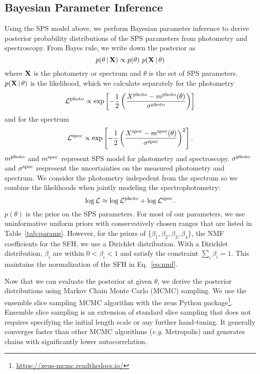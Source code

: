 \subsection{Bayesian Parameter Inference} \label{sec:infer} 
Using the SPS model above, we perform Bayesian parameter inference to derive
posterior probability distributions of the SPS parameters from photometry and
spectroscopy. 
From Bayes rule, we write down the posterior as
\begin{equation} \label{eq:bayes}
    p(\theta\given {\bf X}) \propto p(\theta)~p({\bf X} \given \theta)
\end{equation}
where ${\bf X}$ is the photometry or spectrum and $\theta$ is the set of SPS
parameters. 
$p({\bf X} \,|\, \theta)$ is the likelihood, which we calculate separately for
the photometry
\begin{equation}
    \mathcal{L}^{\rm photo} \propto \exp\left[-\frac{1}{2} \left(\frac{X^{\rm photo} -
    m^{\rm photo}(\theta)}{\sigma^{\rm photo}}\right)\right]
\end{equation}
and for the spectrum
\begin{equation}
    \mathcal{L}^{\rm spec} \propto \exp\left[-\frac{1}{2} \left(\frac{X^{\rm spec} -
    m^{\rm spec}(\theta)}{\sigma^{\rm spec}} \right)^2\right].
\end{equation}
$m^{\rm photo}$ and $m^{\rm spec}$ represent SPS model for photometry and
spectroscopy. 
$\sigma^{\rm photo}$ and $\sigma^{\rm spec}$ respresent the uncertainties on
the measured photometry and spectrum. 
We consider the photometry indepedent from the spectrum so we combine the
likelihoods when jointly modeling the spectrophotometry: 
\begin{equation}
    \log \mathcal{L} \approx \log \mathcal{L}^{\rm photo} + \log
    \mathcal{L}^{\rm spec}.
\end{equation}
$p(\theta)$ is the prior on the SPS parameters. 
For most of our parameters, we use uninformative uniform priors with
conservatively chosen ranges that are listed in Table~\ref{tab:params}. 
However, for the priors of $\{\beta_1, \beta_2, \beta_3, \beta_4 \}$, the NMF coefficients
for the SFH, we use a Dirichlet distribution.  
With a Dirichlet distribution, $\beta_i$ are within $0 < \beta_i < 1$ and
satisfy the constraint $\sum_i \beta_i = 1$. 
This maintains the normalization of the SFH in Eq.~\ref{eq:nmf}. 

Now that we can evaluate the posterior at given $\theta$, we derive the
posterior distributions using Markov Chain Monte Carlo (MCMC) sampling. 
We use the \cite{karamanis2020} ensemble slice sampling MCMC algorithm with the
{\sc zeus} Python
package\footnote{\href{https://zeus-mcmc.readthedocs.io/}{https://zeus-mcmc.readthedocs.io/}}. 
Ensemble slice sampling is an extension of standard slice sampling that does
not requires specifying the initial length scale or any further hand-tuning.
It generally converges faster than other MCMC algorithms (\emph{e.g.}
Metropolis) and generates chains with significantly lower autocorrelation.

